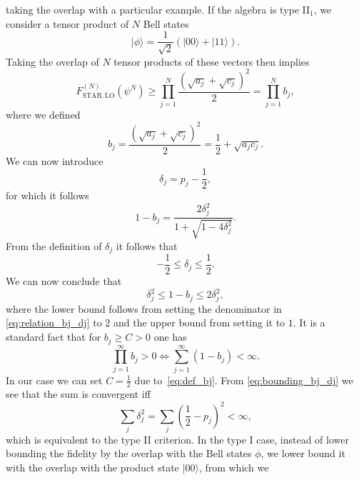 \documentclass[aps,pra,reprint,superscriptaddress]{revtex4-2}
\renewcommand\d{\delta}
\newcommand\p{\phi}
\providecommand{\ket}[1]{\lvert #1\rangle}
\theoremstyle{definition}
\theoremstyle{remark}
\begin{document}
taking the overlap with a particular example. 
If the algebra is type II$_1$, we consider a tensor product of $N$ Bell states
\begin{equation}
    \ket{\p} = \frac{1}{\sqrt{2}} (\ket{00} + \ket{11}).\label{eq:bell-state}
\end{equation}
Taking the overlap of $N$ tensor products of these vectors then implies
\begin{equation}
    F_{\mathrm{STAB},\mathrm{LO}}^{(N)}(\psi^N) \geq \prod_{j=1}^{N}
    \frac{(\sqrt{a_j}+\sqrt{c_j})^2}{2} = \prod_{j=1}^{N}b_j,
\end{equation}
where we defined 
\begin{equation}\label{eq:def_bj}
    b_j = \frac{(\sqrt{a_j} + \sqrt{c_j})^2}{2} =
    \frac{1}{2}+\sqrt{a_j c_j}.
\end{equation}
We can now introduce
\begin{equation}
    \d_j = p_j - \frac{1}{2},\label{eq:def-dj}
\end{equation}
for which it follows 
\begin{equation}\label{eq:relation_bj_dj}
    1-b_j = \frac{2\d_j^2}{1+\sqrt{1-4\d_j^2}}.
\end{equation}
From the definition of $\d_j$ it follows that
\begin{equation}
    -\frac{1}{2} \leq \d_j \leq \frac{1}{2}.
\end{equation}
We can now conclude that
\begin{equation}\label{eq:bounding_bj_dj}
    \d_j^2 \leq 1-b_j \leq 2\d_j^2,
\end{equation}
where the lower bound follows from setting the denominator in
\eqref{eq:relation_bj_dj} to $2$ and the upper bound from setting it to $1$.
It is a standard fact that for $b_j \geq C > 0$ one has
\begin{equation}
    \prod_{j=1}^{\infty} b_j > 0 \Leftrightarrow \sum_{j=1}^\infty
    (1-b_j)
    < \infty.\label{eq:sum-prod-exchange}
\end{equation}
In our case we can set $C = \frac{1}{2}$ due to~\eqref{eq:def_bj}. From
\eqref{eq:bounding_bj_dj} we see that the sum is convergent iff 
\begin{equation}
    \sum_j \d_j^2 = \sum_j (\frac{1}{2}-p_j)^2 < \infty,
\end{equation}
which is equivalent to the type II criterion. In the type I case, instead of
lower bounding the fidelity by the overlap with the Bell states $\p$, we lower
bound it with the overlap with the product state $\ket{00}$, from which we
\end{document}
